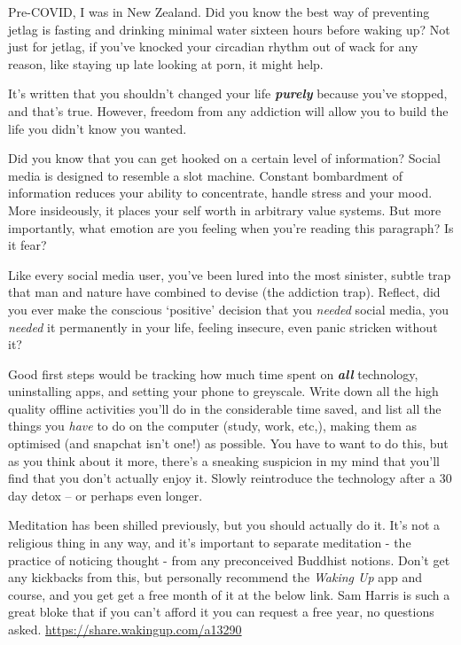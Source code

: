 \documentclass[
]{book}
\begin{document}
Pre-COVID, I was in New Zealand. Did you know the best way of preventing jetlag is fasting and drinking minimal water sixteen hours before waking up? Not just for jetlag, if you've knocked your circadian rhythm out of wack for any reason, like staying up late looking at porn, it might help.

It's written that you shouldn't changed your life \textbf{\emph{purely}} because you've stopped, and that's true. However, freedom from any addiction will allow you to build the life you didn't know you wanted.

Did you know that you can get hooked on a certain level of information? Social media is designed to resemble a slot machine. Constant bombardment of information reduces your ability to concentrate, handle stress and your mood. More insideously, it places your self worth in arbitrary value systems. But more importantly, what emotion are you feeling when you're reading this paragraph? Is it fear?

Like every social media user, you've been lured into the most sinister, subtle trap that man and nature have combined to devise (the addiction trap). Reflect, did you ever make the conscious `positive' decision that you \emph{needed} social media, you \emph{needed} it permanently in your life, feeling insecure, even panic stricken without it?

Good first steps would be tracking how much time spent on \textbf{\emph{all}} technology, uninstalling apps, and setting your phone to greyscale. Write down all the high quality offline activities you'll do in the considerable time saved, and list all the things you \emph{have} to do on the computer (study, work, etc,), making them as optimised (and snapchat isn't one!) as possible. You have to want to do this, but as you think about it more, there's a sneaking suspicion in my mind that you'll find that you don't actually enjoy it. Slowly reintroduce the technology after a 30 day detox -- or perhaps even longer.

Meditation has been shilled previously, but you should actually do it. It's not a religious thing in any way, and it's important to separate meditation - the practice of noticing thought - from any preconceived Buddhist notions.
Don't get any kickbacks from this, but personally recommend the \emph{Waking Up} app and course, and you get get a free month of it at the below link. Sam Harris is such a great bloke that if you can't afford it you can request a free year, no questions asked.
\url{https://share.wakingup.com/a13290}
\end{document}
